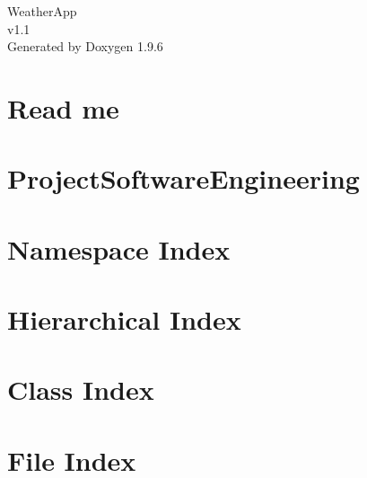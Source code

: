 \documentclass[twoside]{book}
\newcommand{\+}{\discretionary{\mbox{\scriptsize$\hookleftarrow$}}{}{}}
\newcommand{\clearemptydoublepage}{%
    \newpage{\pagestyle{empty}\cleardoublepage}%
  }
\begin{document}
  \raggedbottom
    \hypersetup{pageanchor=false,
                bookmarksnumbered=true,
                pdfencoding=unicode
               }
  \begin{titlepage}
  \vspace*{7cm}
  \begin{center}%
  {\Large Weather\+App}\\
  [1ex]\large v1.\+1 \\
  \vspace*{1cm}
  {\large Generated by Doxygen 1.9.6}\\
  \end{center}
  \end{titlepage}
  \clearemptydoublepage
  \tableofcontents
  \clearemptydoublepage
  \hypersetup{pageanchor=true}
\chapter{Read me}
\label{md_my_server__readme}

\chapter{Project\+Software\+Engineering}
\label{md__r_e_a_d_m_e}

\chapter{Namespace Index}

\chapter{Hierarchical Index}

\chapter{Class Index}

\chapter{File Index}

\end{document}
